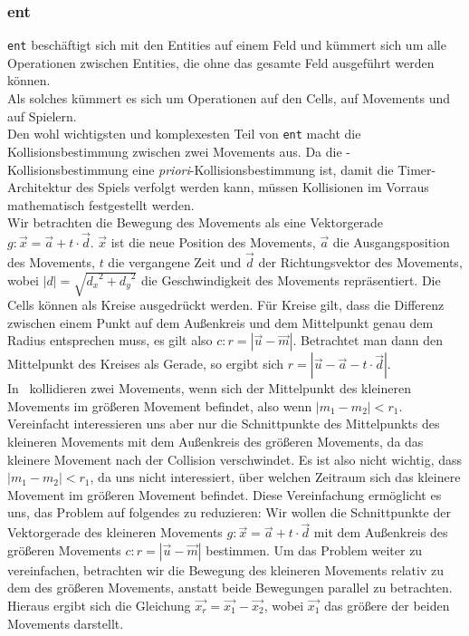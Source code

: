\subsubsection{ent}
\verb+ent+ beschäftigt sich mit den Entities auf einem Feld und kümmert sich um alle Operationen zwischen Entities, die ohne das gesamte Feld ausgeführt werden können. \\
Als solches kümmert es sich um Operationen auf den Cells, auf Movements und auf Spielern. \\
Den wohl wichtigsten und komplexesten Teil von \verb+ent+ macht die Kollisionsbestimmung zwischen zwei Movements aus. Da die \vires-Kollisionsbestimmung eine \textit{priori}-Kollisionsbestimmung ist, damit die Timer-Architektur des Spiels verfolgt werden kann, müssen Kollisionen im Vorraus mathematisch festgestellt werden. \\
Wir betrachten die Bewegung des Movements als eine Vektorgerade $g: \vec{x} = \vec{a} + t \cdot \vec{d}$. $\vec{x}$ ist die neue Position des Movements, $\vec{a}$ die Ausgangsposition des Movements, $t$ die vergangene Zeit und $\vec{d}$ der Richtungsvektor des Movements, wobei $|d| = \sqrt{{d_x}^2 + {d_y}^2}$ die Geschwindigkeit des Movements repräsentiert. Die Cells können als Kreise ausgedrückt werden. Für Kreise gilt, dass die Differenz zwischen einem Punkt auf dem Außenkreis und dem Mittelpunkt genau dem Radius entsprechen muss, es gilt also $c: r = |\vec{u} - \vec{m}|$. Betrachtet man dann den Mittelpunkt des Kreises als Gerade, so ergibt sich $r = |\vec{u} - \vec{a} - t \cdot \vec{d}|$.\\
In \vires\ kollidieren zwei Movements, wenn sich der Mittelpunkt des kleineren Movements im größeren Movement befindet, also wenn $|m_1 - m_2| < r_1$. Vereinfacht interessieren uns aber nur die Schnittpunkte des Mittelpunkts des kleineren Movements mit dem Außenkreis des größeren Movements, da das kleinere Movement nach der Collision verschwindet. Es ist also nicht wichtig, dass $|m_1 - m_2| < r_1$, da uns nicht interessiert, über welchen Zeitraum sich das kleinere Movement im größeren Movement befindet. Diese Vereinfachung ermöglicht es uns, das Problem auf folgendes zu reduzieren: Wir wollen die Schnittpunkte der Vektorgerade des kleineren Movements $g: \vec{x} = \vec{a} + t \cdot \vec{d}$ mit dem Außenkreis des größeren Movements $c: r = |\vec{u} - \vec{m}|$ bestimmen. 
Um das Problem weiter zu vereinfachen, betrachten wir die Bewegung des kleineren Movements relativ zu dem des größeren Movements, anstatt beide Bewegungen parallel zu betrachten. Hieraus ergibt sich die Gleichung $\vec{x_r} = \vec{x_1} - \vec{x_2}$, wobei $\vec{x_1}$ das größere der beiden Movements darstellt.
